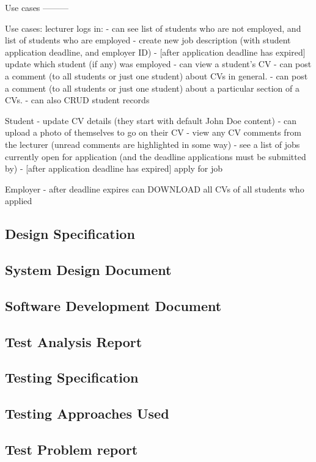\documentclass[a4paper,12pt]{article}
\begin{document}
\begin{samepage}
Use cases
---------

Use cases: lecturer logs in:
- can see list of students who are not employed, and list of students who are employed
- create new job description (with student application deadline, and employer ID)
- [after application deadline has expired] update which student (if any) was employed
- can view a student’s CV
- can post a comment (to all students or just one student) about CVs in general.
- can post a comment (to all students or just one student) about a particular section of a CVs.
- can also CRUD student records

Student
- update CV details (they start with default John Doe content)
- can upload a photo of themselves to go on their CV
- view any CV comments from the lecturer (unread comments are highlighted in some way)
- see a list of jobs currently open for application (and the deadline applications must be submitted by)
- [after application deadline has expired] apply for job


Employer
- after deadline expires can DOWNLOAD all CVs of all students who applied

\end{samepage}
\begin{samepage}
\section{Design Specification}
\subsection {System Design Document}
\subsection {Software Development Document}
\subsection {Test Analysis Report}
\end{samepage}
\begin{samepage}
\section {Testing Specification}
\subsection {Testing Approaches Used}
\subsection {Test Problem report}
\end{samepage}
\end{document}

